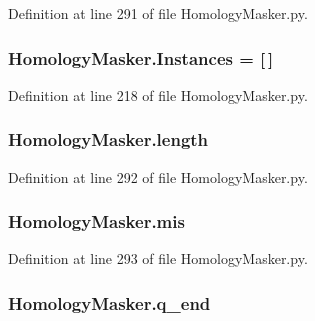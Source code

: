 Definition at line 291 of file Homology\-Masker.\-py.

\hypertarget{namespaceHomologyMasker_af353f622b88a872386648a331c09b7ec}{
\subsubsection[{Instances}]{\setlength{\rightskip}{0pt plus 5cm}Homology\-Masker.\-Instances = \mbox{[}$\,$\mbox{]}}}\label{namespaceHomologyMasker_af353f622b88a872386648a331c09b7ec}


Definition at line 218 of file Homology\-Masker.\-py.

\hypertarget{namespaceHomologyMasker_ad039fae339d2981cc166e872097af80a}{
\subsubsection[{length}]{\setlength{\rightskip}{0pt plus 5cm}Homology\-Masker.\-length}}\label{namespaceHomologyMasker_ad039fae339d2981cc166e872097af80a}


Definition at line 292 of file Homology\-Masker.\-py.

\hypertarget{namespaceHomologyMasker_a1aaaaf3e8d19615bab2d1123a2b815b4}{
\subsubsection[{mis}]{\setlength{\rightskip}{0pt plus 5cm}Homology\-Masker.\-mis}}\label{namespaceHomologyMasker_a1aaaaf3e8d19615bab2d1123a2b815b4}


Definition at line 293 of file Homology\-Masker.\-py.

\hypertarget{namespaceHomologyMasker_a7ad98af9d6be3028e1cfd7a538636db2}{
\subsubsection[{q\-\_\-end}]{\setlength{\rightskip}{0pt plus 5cm}Homology\-Masker.\-q\-\_\-end}}\label{namespaceHomologyMasker_a7ad98af9d6be3028e1cfd7a538636db2}



